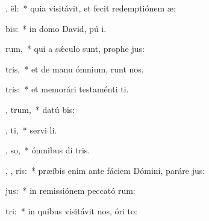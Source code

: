 \item {} ,  ël:~* quia visitávit, et fecit redemptiónem  æ:
\item {}    bis:~* in domo David, pú i.
\item {}     rum,~* qui a sǽculo sunt, prophe jus:
\item {}   tris,~* et de manu ómnium,  runt nos.
\item {}     tris:~* et memorári testaménti  ti.
\item {},      trum,~* datú  bis:
\item {}  ,     ti,~* servi li.
\item {} ,    so,~* ómnibus di tris.
\item {} , ,   ris:~* præíbis enim ante fáciem Dómini, paráre  jus:
\item {}     jus:~* in remissiónem peccató rum:
\item {}    tri:~* in quibus visitávit nos, óri  to:
